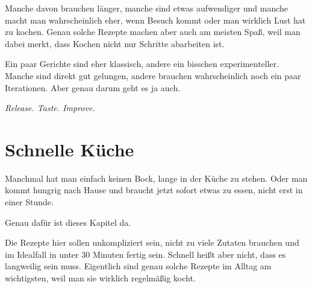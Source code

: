 \documentclass[
  a4paper,
  twoside,
  11pt
]{article}
\begin{document}
Manche davon brauchen länger, manche sind etwas aufwendiger und manche macht man wahrscheinlich eher, wenn Besuch kommt oder man wirklich Lust hat zu kochen. Genau solche Rezepte machen aber auch am meisten Spaß, weil man dabei merkt, dass Kochen nicht nur Schritte abarbeiten ist.

Ein paar Gerichte sind eher klassisch, andere ein bisschen experimenteller. Manche sind direkt gut gelungen, andere brauchen wahrscheinlich noch ein paar Iterationen. Aber genau darum geht es ja auch.

\textit{Release. Taste. Improve.}

\mylocaltableofcontents%
\newpage











\section{Schnelle Küche}

Manchmal hat man einfach keinen Bock, lange in der Küche zu stehen. Oder man kommt hungrig nach Hause und braucht jetzt sofort etwas zu essen, nicht erst in einer Stunde.

Genau dafür ist dieses Kapitel da.

Die Rezepte hier sollen unkompliziert sein, nicht zu viele Zutaten brauchen und im Idealfall in unter 30 Minuten fertig sein. Schnell heißt aber nicht, dass es langweilig sein muss. Eigentlich sind genau solche Rezepte im Alltag am wichtigsten, weil man sie wirklich regelmäßig kocht.

\mylocaltableofcontents%
\newpage








\end{document}
